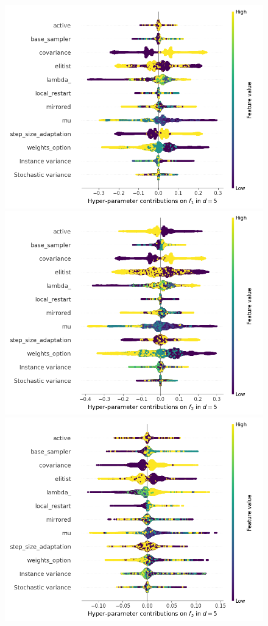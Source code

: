 \begin{figure}[t]
\centering
	\includegraphics[height=0.15\textheight,trim=0mm 0mm 30mm 0mm,clip]{cma_img_new/img_summary_f1_d5.png}
	\includegraphics[height=0.15\textheight,trim=60mm 0mm 30mm 0mm,clip]{cma_img_new/img_summary_f2_d5.png}
	\includegraphics[height=0.15\textheight,trim=60mm 0mm 30mm 0mm,clip]{cma_img_new/img_summary_f3_d5.png}

\end{figure}
